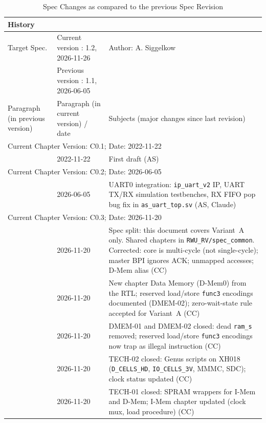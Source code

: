 \begin{table}[H]
\caption{Spec Changes as compared to the previous \aschip \; Spec Revision}
\label{tab:docover_history01}
\centering
\begin{tabularx}{\textwidth}{|X |X |X |}
  \hline
  \multicolumn{3}{|l|}{History} \\
  \hline
  \multicolumn{1}{|l}{Target Spec.} & \multicolumn{1}{l}{Current version : 1.2, 2026-11-26} & \multicolumn{1}{l|}{Author: A. Siggelkow}\\
  \multicolumn{1}{|l}{ } & \multicolumn{1}{l}{Previous version : 1.1, 2026-06-05} & \multicolumn{1}{l|}{ }\\
  \hline
  \hline
  Paragraph (in previous version) & Paragraph (in current version) / date & Subjects (major changes since last revision) \\
  \hline
  \hline
  \multicolumn{3}{|l|}{Current Chapter Version: C0.1; Date: 2022-11-22} \\
  \hline
  & 2022-11-22 & First draft (AS) \\
  \hline
  \multicolumn{3}{|l|}{Current Chapter Version: C0.2; Date: 2026-06-05} \\
  \hline
  & 2026-06-05 & UART0 integration: \texttt{ip\_uart\_v2} IP, UART TX/RX simulation testbenches, RX FIFO pop bug fix in \texttt{as\_uart\_top.sv} (AS, Claude) \\
  \hline
  \multicolumn{3}{|l|}{Current Chapter Version: C0.3; Date: 2026-11-20} \\
  \hline
  & 2026-11-20 & Spec split: this document covers Variant~A only. Shared chapters in \texttt{RWU\_RV/spec\_common}. Corrected: core is multi-cycle (not single-cycle); master BPI ignores ACK; unmapped accesses; D-Mem alias (CC) \\
  \hline
  & 2026-11-20 & New chapter Data Memory (D-Mem0) from the RTL; reserved load/store \texttt{func3} encodings documented (DMEM-02); zero-wait-state rule accepted for Variant~A (CC) \\
  \hline
  & 2026-11-20 & DMEM-01 and DMEM-02 closed: dead \texttt{ram\_s} removed; reserved load/store \texttt{func3} encodings now trap as illegal instruction (CC) \\
  \hline
  & 2026-11-20 & TECH-02 closed: Genus scripts on XH018 (\texttt{D\_CELLS\_HD}, \texttt{IO\_CELLS\_3V}, MMMC, SDC); clock status updated (CC) \\
  \hline
  & 2026-11-20 & TECH-01 closed: SPRAM wrappers for I-Mem and D-Mem; I-Mem chapter updated (clock mux, load procedure) (CC) \\

\end{tabularx}
\end{table}
